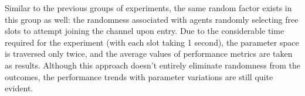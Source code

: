 Similar to the previous groups of experiments, the same random factor exists in this group as well: the randomness associated with agents randomly selecting free slots to attempt joining the channel upon entry. 
Due to the considerable time required for the experiment (with each slot taking 1 second), the parameter space is traversed only twice, and the average values of performance metrics are taken as results. 
Although this approach doesn't entirely eliminate randomness from the outcomes, the performance trends with parameter variations are still quite evident.


